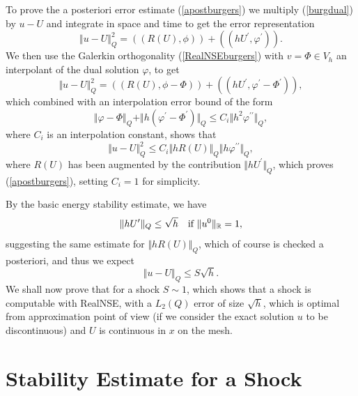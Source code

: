 To prove the a posteriori error estimate (\ref{apostburgers})
we multiply (\ref{burgdual}) by $u-U$ and integrate in space and time
to get the error representation
\[
\Vert u-U\Vert_{Q}^2=((R(U),\phi ))+((hU^\prime ,\varphi^\prime )).
\]
We then use the Galerkin orthogonality (\ref{RealNSEburgers})
with $v=\Phi\in V_h$ an interpolant of the dual solution $\varphi$, to get
\[
\Vert u-U\Vert_{Q}^2=((R(U),\phi -\Phi ))+
((hU^\prime ,\varphi^\prime -\Phi^\prime )),
\]
which combined with an interpolation error bound of the form 
\[
\Vert\varphi -\Phi\Vert_{Q}+\Vert h(\varphi^\prime -\Phi^\prime )\Vert_{Q}\le
C_i\Vert h^2\varphi^{\prime\prime}\Vert_{Q},
\]
where $C_i$ is an interpolation constant, shows that
\[ 
\Vert u-U\Vert_{Q}^2\le C_i\Vert hR(U)\Vert_{Q}\Vert h\varphi^{\prime\prime}\Vert_{Q},
\]
where $R(U)$ has been augmented by the contribution $\Vert hU^\prime\Vert_Q$,
which proves (\ref{apostburgers}), setting $C_i=1$ for simplicity.

By the basic energy stability estimate, we have
\[
\Vert hU^\prime\Vert_{Q}\le\sqrt{h}\quad \mbox{if }\Vert u^0\Vert_{\mathbb{R}} =1,
\]
suggesting the same estimate for $\Vert hR(U)\Vert_Q$, 
which of course is checked a posteriori, and thus we expect
\begin{equation}\label{apostburgers2}
\Vert u-U\Vert_{Q}\le S\sqrt{h} .
\end{equation}
We shall now prove that for a shock $S\sim 1$, which shows that
a shock is computable with RealNSE, with a $L_2(Q)$ error of size $\sqrt{h}$, which
is optimal from approximation point of view (if we consider 
the exact solution $u$ to be discontinuous) 
and $U$ is continuous in $x$ on the mesh.


\section{Stability Estimate for a Shock}

